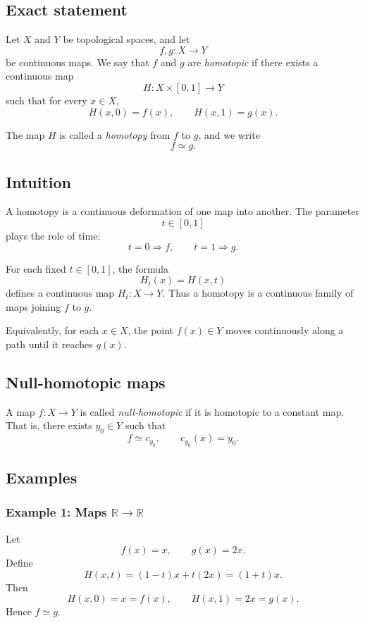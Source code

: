 \documentclass[12pt,a4paper]{article}
\theoremstyle{notespace}
\begin{document}
\subsection{Exact statement}

Let \(X\) and \(Y\) be topological spaces, and let
\[
f,g:X\to Y
\]
be continuous maps. We say that \(f\) and \(g\) are \emph{homotopic} if there exists a continuous map
\[
H:X\times[0,1]\to Y
\]
such that for every \(x\in X\),
\[
H(x,0)=f(x),\qquad H(x,1)=g(x).
\]

The map \(H\) is called a \emph{homotopy} from \(f\) to \(g\), and we write
\[
f\simeq g.
\]

\subsection{Intuition}

A homotopy is a continuous deformation of one map into another. The parameter
\[
t\in[0,1]
\]
plays the role of time:
\[
t=0 \Rightarrow f,\qquad t=1 \Rightarrow g.
\]

For each fixed \(t\in[0,1]\), the formula
\[
H_t(x)=H(x,t)
\]
defines a continuous map \(H_t:X\to Y\). Thus a homotopy is a continuous family of maps joining \(f\) to \(g\).

Equivalently, for each \(x\in X\), the point \(f(x)\in Y\) moves continuously along a path until it reaches \(g(x)\).

\subsection{Null-homotopic maps}

A map \(f:X\to Y\) is called \emph{null-homotopic} if it is homotopic to a constant map. That is, there exists \(y_0\in Y\) such that
\[
f\simeq c_{y_0},
\qquad
c_{y_0}(x)=y_0.
\]

\subsection{Examples}

\subsubsection{Example 1: Maps \(\mathbb R\to\mathbb R\)}

Let
\[
f(x)=x,\qquad g(x)=2x.
\]
Define
\[
H(x,t)=(1-t)x+t(2x)=(1+t)x.
\]
Then
\[
H(x,0)=x=f(x),
\qquad
H(x,1)=2x=g(x).
\]
Hence \(f\simeq g\).
\end{document}
